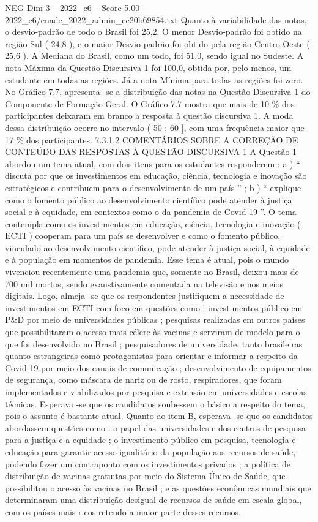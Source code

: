 \begin{textsample}{NEG Dim 3 – 2022\_c6 – Score 5.00 – 2022\_c6/enade\_2022\_admin\_cc20b69854.txt}
Quanto à variabilidade das notas, o desvio-padrão de todo o Brasil foi 25,2.
O menor Desvio-padrão foi obtido na região Sul ( 24,8 ), e o maior Desvio-padrão foi obtido pela região Centro-Oeste ( 25,6 ).
A Mediana do Brasil, como um todo, foi 51,0, sendo igual no Sudeste.
A nota Máxima da Questão Discursiva 1 foi 100,0, obtida por, pelo menos, um estudante em todas as regiões.
Já a nota Mínima para todas as regiões foi zero.
No Gráfico 7.7, apresenta -se a distribuição das notas na Questão Discursiva 1 do Componente de Formação Geral.
O Gráfico 7.7 mostra que mais de 10 \% dos participantes deixaram em branco a resposta à questão discursiva 1.
A moda dessa distribuição ocorre no intervalo ( 50 ; 60 ], com uma frequência maior que 17 \% dos participantes. 7.3.1.2 COMENTÁRIOS SOBRE A CORREÇÃO DE CONTEÚDO DAS RESPOSTAS À QUESTÃO DISCURSIVA 1 A Questão 1 abordou um tema atual, com dois itens para os estudantes responderem : a ) “ discuta por que os investimentos em educação, ciência, tecnologia e inovação são estratégicos e contribuem para o desenvolvimento de um país ” ; b ) “ explique como o fomento público ao desenvolvimento científico pode atender à justiça social e à equidade, em contextos como o da pandemia de Covid-19 ”.
O tema contempla como os investimentos em educação, ciência, tecnologia e inovação ( ECTI ) cooperam para um país se desenvolver e como o fomento público, vinculado ao desenvolvimento científico, pode atender à justiça social, à equidade e à população em momentos de pandemia.
Esse tema é atual, pois o mundo vivenciou recentemente uma pandemia que, somente no Brasil, deixou mais de 700 mil mortos, sendo exaustivamente comentada na televisão e nos meios digitais.
Logo, almeja -se que os respondentes justifiquem a necessidade de investimentos em ECTI com foco em questões como : investimentos público em P\&D por meio de universidades públicas ; pesquisas realizadas em outros países que possibilitaram o acesso mais célere às vacinas e serviram de modelo para o que foi desenvolvido no Brasil ; pesquisadores de universidade, tanto brasileiras quanto estrangeiras como protagonistas para orientar e informar a respeito da Covid-19 por meio dos canais de comunicação ; desenvolvimento de equipamentos de segurança, como máscara de nariz ou de rosto, respiradores, que foram implementados e viabilizados por pesquisa e extensão em universidades e escolas técnicas.
Esperava -se que os candidatos soubessem o básico a respeito do tema, pois o assunto é bastante atual.
Quanto ao item B, esperava -se que os candidatos abordassem questões como : o papel das universidades e dos centros de pesquisa para a justiça e a equidade ; o investimento público em pesquisa, tecnologia e educação para garantir acesso igualitário da população aos recursos de saúde, podendo fazer um contraponto com os investimentos privados ; a política de distribuição de vacinas gratuitas por meio do Sistema Único de Saúde, que possibilitou o acesso às vacinas no Brasil ; e as questões econômicas mundiais que determinaram uma distribuição desigual de recursos de saúde em escala global, com os países mais ricos retendo a maior parte desses recursos.

\end{textsample}
